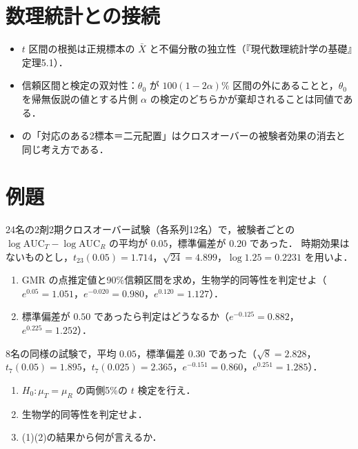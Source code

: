 \section{数理統計との接続}\label{sec:13-link}
\begin{linkbox}
\begin{itemize}
\item $t$ 区間の根拠は正規標本の $\bar X$ と不偏分散の独立性（『現代数理統計学の基礎』定理5.1）．
\item 信頼区間と検定の双対性：$\theta_0$ が $100(1-2\alpha)\%$ 区間の外にあることと，$\theta_0$ を帰無仮説の値とする片側 $\alpha$ の検定のどちらかが棄却されることは同値である．
\item {} の「対応のある2標本＝二元配置」はクロスオーバーの被験者効果の消去と同じ考え方である．
\end{itemize}
\end{linkbox}

\section{例題}\label{sec:13-ex}
\begin{reidai}[生物学的同等性]\label{reidai:13-1}
24名の2剤2期クロスオーバー試験（各系列12名）で，被験者ごとの $\log\mathrm{AUC}_T-\log\mathrm{AUC}_R$ の平均が $0.05$，標準偏差が $0.20$ であった．
時期効果はないものとし，$t_{23}(0.05)=1.714$，$\sqrt{24}=4.899$，$\log1.25=0.2231$ を用いよ．
\begin{enumerate}[label=(\arabic*)]
\item GMR の点推定値と90\%信頼区間を求め，生物学的同等性を判定せよ（$e^{0.05}=1.051$，$e^{-0.020}=0.980$，$e^{0.120}=1.127$）．
\item 標準偏差が $0.50$ であったら判定はどうなるか（$e^{-0.125}=0.882$，$e^{0.225}=1.252$）．
\end{enumerate}
\end{reidai}

\begin{reidai}[有意差なしと同等]\label{reidai:13-2}
8名の同様の試験で，平均 $0.05$，標準偏差 $0.30$ であった（$\sqrt8=2.828$，$t_7(0.05)=1.895$，$t_7(0.025)=2.365$，$e^{-0.151}=0.860$，$e^{0.251}=1.285$）．
\begin{enumerate}[label=(\arabic*)]
\item $H_0:\mu_T=\mu_R$ の両側5\%の $t$ 検定を行え．
\item 生物学的同等性を判定せよ．
\item (1)(2)の結果から何が言えるか．
\end{enumerate}
\end{reidai}

